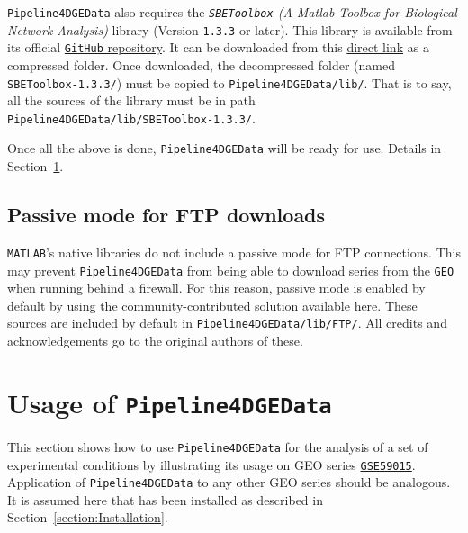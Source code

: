 \documentclass[final,letterpaper,12pt]{article}
\begin{document}
\par \texttt{Pipeline4DGEData} also requires the \textit{\texttt{SBEToolbox} (A Matlab Toolbox for Biological Network Analysis)} library \citep{konganti2013sbetoolbox} (Version \texttt{1.3.3} or later). This library is available from its official \href{https://github.com/biocoder/SBEToolbox/releases}{\texttt{GitHub} repository}. It can be downloaded from this \href{https://github.com/biocoder/SBEToolbox/archive/v1.3.3.zip}{direct link} as a compressed folder. Once downloaded, the decompressed folder (named \texttt{SBEToolbox-1.3.3/}) must be copied to \texttt{Pipeline4DGEData/lib/}. That is to say, all the sources of the library must be in path \texttt{Pipeline4DGEData/lib/SBEToolbox-1.3.3/}.

\par Once all the above is done, \texttt{Pipeline4DGEData} will be ready for use. Details in Section~\ref{section:daExample}.

\subsection{Passive mode for FTP downloads}

\par \texttt{MATLAB}'s native libraries do not include a passive mode for FTP connections. This may prevent \texttt{Pipeline4DGEData} from being able to download series from the \texttt{GEO} when running behind a firewall. For this reason, passive mode is enabled by default by using the community-contributed solution available \href{https://www.mathworks.com/matlabcentral/fileexchange/6626-passive-mode-ftp-in-matlab}{here}. These sources are included by default in \texttt{Pipeline4DGEData/lib/FTP/}. All credits and acknowledgements go to the original authors of these.



\section{Usage of \texttt{Pipeline4DGEData}}
\label{section:daExample}

\par This section shows how to use \texttt{Pipeline4DGEData} for the analysis of a set of experimental conditions by illustrating its usage on GEO series \href{https://www.ncbi.nlm.nih.gov/geo/query/acc.cgi?acc=GSE59015}{\texttt{GSE59015}}. Application of \texttt{Pipeline4DGEData} to any other GEO series should be analogous. It is assumed here that has been installed as described in Section~\ref{section:Installation}.
\end{document}
